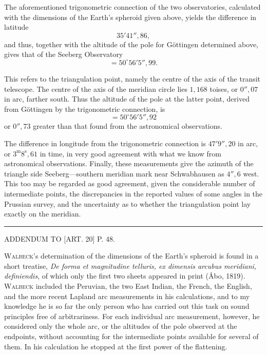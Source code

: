 The aforementioned trigonometric connection of the two observatories, calculated
with the dimensions of the Earth's spheroid given above, yields the difference
in latitude
\[
35'41''{,}86,
\]
\noindent and thus, together with the altitude of the pole for Göttingen determined
above, gives that of the Seeberg Observatory
\[
=50^\circ56'5''{,}99.
\]

This refers to the triangulation point, namely the centre of the axis of the
transit telescope. The centre of the axis of the meridian circle lies \(1{,}168\)
toises, or \(0''{,}07\) in arc, farther south. Thus the altitude of the pole at
the latter point, derived from Göttingen by the trigonometric connection, is
\[
=50^\circ56'5''{,}92
\]
\noindent or \(0''{,}73\) greater than that found from the astronomical observations.

The difference in longitude from the trigonometric connection is \(47'9''{,}20\)
in arc, or \(3^{\mathrm m}8^{\mathrm s}{,}61\) in time, in very good agreement
with what we know from astronomical observations. Finally, these measurements
give the azimuth of the triangle side Seeberg---southern meridian mark near
Schwabhausen as \(4''{,}6\) west. This too may be regarded as good agreement,
given the considerable number of intermediate points, the discrepancies in the
reported values of some angles in the Prussian survey, and the uncertainty
as to whether the triangulation point lay exactly on the meridian.

\begin{center}\rule{.24\textwidth}{.4pt}\end{center}

\par\clearpage

\vspace*{.055\textheight}
\begin{center}{\Large ADDENDUM TO [ART. 20] P. 48.}\end{center}

\textsc{Walbeck}'s determination of the dimensions of the Earth's spheroid is
found in a short treatise, \textit{De forma et magnitudine telluris, ex dimensis
arcubus meridiani, definiendis}, of which only the first two sheets appeared in
print (Åbo, 1819). \textsc{Walbeck} included the Peruvian, the two East Indian,
the French, the English, and the more recent Lapland arc measurements in his
calculations, and to my knowledge he is so far the only person who has carried
out this task on sound principles free of arbitrariness. For each individual arc
measurement, however, he considered only the whole arc, or the altitudes of the
pole observed at the endpoints, without accounting for the intermediate points
available for several of them. In his calculation he stopped at the first power
of the flattening.

